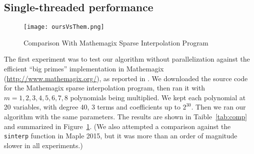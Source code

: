 \documentclass[letterpaper,10pt]{article}
\def\cite{\citep}
\begin{document}
\subsection{Single-threaded performance}


\begin{figure}[tbp]
\texttt{[image: oursVsThem.png]}
\caption{Comparison With Mathemagix Sparse Interpolation Program\label{fig:comparison}}
\end{figure}

The first experiment was to test our algorithm 
without parallelization against
the efficient ``big primes'' implementation in Mathemagix 
(\url{http://www.mathemagix.org/}), as
reported in \cite{HL15}.
We downloaded the source code for the Mathemagix sparse
interpolation program, then ran it with $m=1, 2, 3, 4, 5, 6, 7, 8$ polynomials 
being multiplied. We kept each polynomial at 20 variables, with degree 40, 3 terms 
and coefficients up to $2^{30}$. Then we ran our algorithm with the same parameters. 
The results are shown in Taible~\ref{tab:comp} and summarized in
Figure~\ref{fig:comparison}. 
(We also
attempted a comparison against the \texttt{sinterp} function in Maple 2015,
but it was more than an order of magnitude slower in all experiments.)
\end{document}
